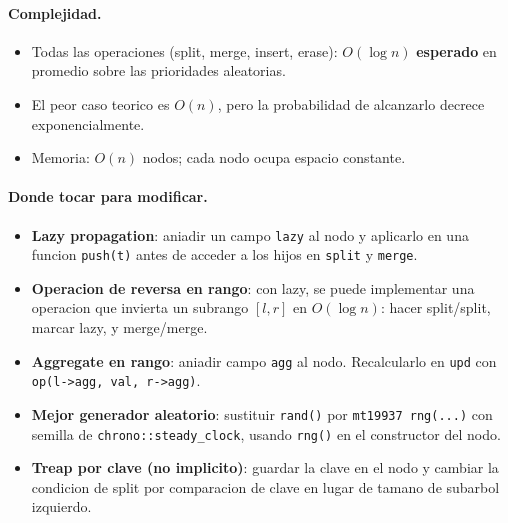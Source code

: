 \paragraph{Complejidad.}
\begin{itemize}\setlength\itemsep{0pt}
	\item Todas las operaciones (split, merge, insert, erase): $O(\log n)$ \textbf{esperado} en promedio sobre las prioridades aleatorias.
	\item El peor caso teorico es $O(n)$, pero la probabilidad de alcanzarlo decrece exponencialmente.
	\item Memoria: $O(n)$ nodos; cada nodo ocupa espacio constante.
\end{itemize}

\paragraph{Donde tocar para modificar.}
\begin{itemize}\setlength\itemsep{0pt}
	\item \textbf{Lazy propagation}: aniadir un campo \verb|lazy| al nodo y aplicarlo en una funcion \verb|push(t)| antes de acceder a los hijos en \verb|split| y \verb|merge|.
	\item \textbf{Operacion de reversa en rango}: con lazy, se puede implementar una operacion que invierta un subrango $[l, r]$ en $O(\log n)$: hacer split/split, marcar lazy, y merge/merge.
	\item \textbf{Aggregate en rango}: aniadir campo \verb|agg| al nodo. Recalcularlo en \verb|upd| con \verb|op(l->agg, val, r->agg)|.
	\item \textbf{Mejor generador aleatorio}: sustituir \verb|rand()| por \verb|mt19937 rng(...)| con semilla de \verb|chrono::steady_clock|, usando \verb|rng()| en el constructor del nodo.
	\item \textbf{Treap por clave (no implicito)}: guardar la clave en el nodo y cambiar la condicion de split por comparacion de clave en lugar de tamano de subarbol izquierdo.
\end{itemize}

